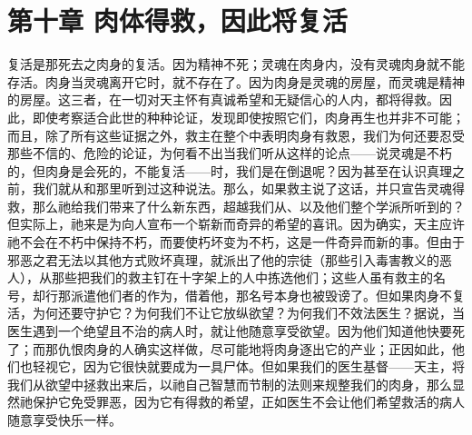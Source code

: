 
\section{第十章  肉体得救，因此将复活}

复活是那死去之肉身的复活。因为精神不死；灵魂在肉身内，没有灵魂肉身就不能存活。肉身当灵魂离开它时，就不存在了。因为肉身是灵魂的房屋，而灵魂是精神的房屋。这三者，在一切对天主怀有真诚希望和无疑信心的人内，都将得救。因此，即使考察适合此世的种种论证，发现即使按照它们，肉身再生也并非不可能；而且，除了所有这些证据之外，救主在整个中表明肉身有救恩，我们为何还要忍受那些不信的、危险的论证，为何看不出当我们听从这样的论点——说灵魂是不朽的，但肉身是会死的，不能复活——时，我们是在倒退呢？因为甚至在认识真理之前，我们就从和那里听到过这种说法。那么，如果救主说了这话，并只宣告灵魂得救，那么祂给我们带来了什么新东西，超越我们从、以及他们整个学派所听到的？但实际上，祂来是为向人宣布一个崭新而奇异的希望的喜讯。因为确实，天主应许祂不会在不朽中保持不朽，而要使朽坏变为不朽，这是一件奇异而新的事。但由于邪恶之君无法以其他方式败坏真理，就派出了他的宗徒（那些引入毒害教义的恶人），从那些把我们的救主钉在十字架上的人中拣选他们；这些人虽有救主的名号，却行那派遣他们者的作为，借着他，那名号本身也被毁谤了。但如果肉身不复活，为何还要守护它？为何我们不让它放纵欲望？为何我们不效法医生？据说，当医生遇到一个绝望且不治的病人时，就让他随意享受欲望。因为他们知道他快要死了；而那仇恨肉身的人确实这样做，尽可能地将肉身逐出它的产业；正因如此，他们也轻视它，因为它很快就要成为一具尸体。但如果我们的医生基督——天主，将我们从欲望中拯救出来后，以祂自己智慧而节制的法则来规整我们的肉身，那么显然祂保护它免受罪恶，因为它有得救的希望，正如医生不会让他们希望救活的病人随意享受快乐一样。\par

